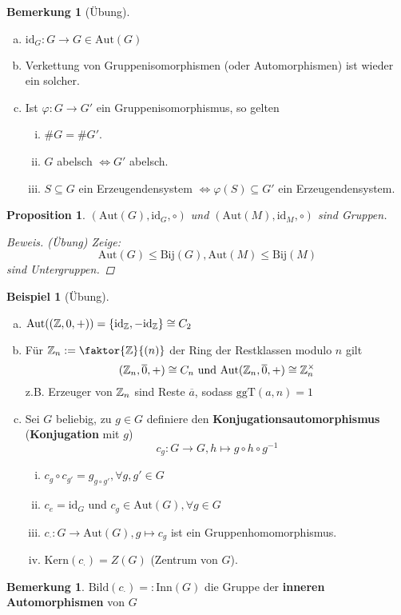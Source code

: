 \documentclass[a4paper]{article}
\theoremstyle{plain}
\newtheorem{prop}[thm]{Proposition}
\theoremstyle{definition}
\newtheorem{bem}[thm]{Bemerkung}
\newtheorem*{bem*}{Bemerkung}
\newtheorem{bsp}[thm]{Beispiel}
\begin{document}
\begin{bem}[Übung]
  \begin{enumerate}[(a)]
    \item $\mathrm{id}_{G} : G \to G \in \mathrm{Aut}(G)$
    \item Verkettung von Gruppenisomorphismen (oder Automorphismen) ist wieder ein solcher.
    \item Ist $\varphi : G \to G'$ ein Gruppenisomorphismus, so gelten
          \begin{enumerate}[(i)]
            \item $\#G = \#G'$.
            \item $G$ abelsch $\iff G'$ abelsch.
            \item $S \subseteq G$ ein Erzeugendensystem $\iff \varphi(S) \subseteq G'$ ein Erzeugendensystem.
          \end{enumerate}
  \end{enumerate}
\end{bem}


\begin{prop} $(\mathrm{Aut}(G), \mathrm{id}_{G}, \circ)$ und $(\mathrm{Aut}(M), \mathrm{id}_{M}, \circ)$ sind Gruppen.
  \begin{proof}[Beweis](Übung) Zeige: $$\mathrm{Aut}(G) \le \mathrm{Bij}(G) , \mathrm{Aut}(M) \le \mathrm{Bij}(M)$$
sind Untergruppen.
  \end{proof}
\end{prop}

\begin{bsp}[Übung]\item
  \begin{enumerate}[(a)]
    \item $\mathrm{Aut}((\Bbb Z, 0, +)) = \{\mathrm{id}_{\Bbb Z}, - \mathrm{id}_{\Bbb Z}\} \cong C_{2}$
    \item Für $\Bbb Z_{n}:= \faktor{\Bbb Z}{(n)}$ der Ring der Restklassen modulo $n$ gilt
          $$(\Bbb Z_{n}, \overline 0, +) \cong C_{n} \text{ und } \mathrm{Aut}(\Bbb Z_{n}, \overline 0, +) \cong \Bbb Z_{n}^{\times}$$
          z.B. Erzeuger von $\Bbb Z_{n}$ sind Reste $\overline a$, sodass $\mathrm{ggT}(a,n) = 1$
    \item Sei $G$ beliebig, zu $g \in G$ definiere den \textbf{Konjugationsautomorphismus} (\textbf{Konjugation} mit $g$)
          $$c_{g}: G \to G, h \mapsto g\circ h \circ g^{-1}$$
\begin{enumerate}[(i)]
  \item $c_{g} \circ c_{g'} = g_{g\circ g'}, \forall g, g' \in G$
  \item $c_{e} = \mathrm{id}_{G}$ und $c_{g} \in \mathrm{Aut}(G), \forall g \in G$
  \item $c_{\cdot}: G \to \mathrm{Aut}(G), g \mapsto c_{g}$ ist ein Gruppenhomomorphismus.
  \item $\mathrm{Kern}(c_{\cdot}) = Z(G)$ (Zentrum von $G$).
\end{enumerate}
  \end{enumerate}
\end{bsp}
\begin{bem*}
$\mathrm{Bild}(c_{\cdot}) =: \mathrm{Inn}(G)$ die Gruppe der \textbf{inneren Automorphismen} von $G$
\end{bem*}
\end{document}
